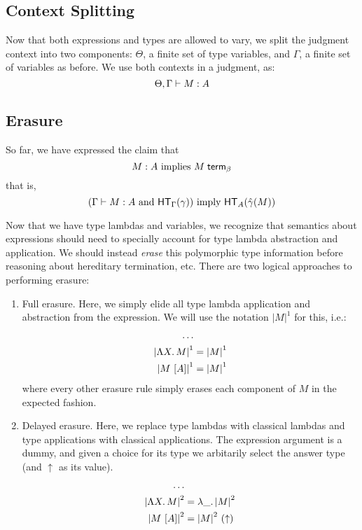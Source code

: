 \documentclass{article}
\begin{document}
\subsection{Context Splitting}

Now that both expressions and types are allowed to vary, we split the judgment context into two
components: $\Theta$, a finite set of type variables, and $\Gamma$, a finite set of variables as
before. We use both contexts in a judgment, as:
\[ \Theta, \Gamma \vdash M : A \]

\subsection{Erasure}

So far, we have expressed the claim that
\[ M : A~\text{implies}~{M} \; \mathsf{term}_{\beta} \]
that is,
\[(\Gamma \vdash M : A~\text{and}~\mathsf{HT}_{\Gamma}(\gamma))~\text{imply}~\mathsf{HT}_{A}(\hat\gamma(M)) \]

\newcommand{\eraseone}[1]{\ensuremath{{|#1|}^1}}
\newcommand{\erasetwo}[1]{\ensuremath{{|#1|}^2}}
Now that we have type lambdas and variables, we recognize that semantics about expressions should
need to specially account for type lambda abstraction and application. We should instead \emph{erase}
this polymorphic type information before reasoning about hereditary termination, etc. There are
two logical approaches to performing erasure:
\begin{enumerate}
    \item Full erasure. Here, we simply elide all type lambda application and abstraction from
    the expression. We will use the notation \eraseone{M} for this, i.e.:
    \begin{align*}
    \ldots &\\
    \eraseone{\tlam{X}{M}} &= \eraseone{M}\\
    \eraseone{\tap{M}{A}} &= \eraseone{M}
    \end{align*}
    where every other erasure rule simply erases each component of $M$ in the expected fashion.
    \item Delayed erasure. Here, we replace type lambdas with classical lambdas and type applications
    with classical applications. The expression argument is a dummy, and given a choice for its type
    we arbitarily select the answer type (and $\uparrow$ as its value).
    \begin{align*}
    \ldots &\\
    \erasetwo{\tlam{X}{M}} &= \alam{\erasetwo{M}}\\
    \erasetwo{\tap{M}{A}} &= \ap{\erasetwo{M}}{(\uparrow)}
    \end{align*}
\end{enumerate}
\end{document}
